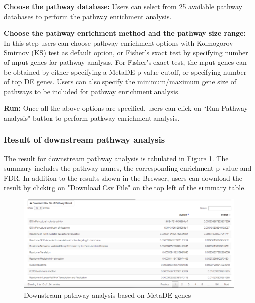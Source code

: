 \begin{steps}
\item \textbf{Choose the pathway database:}
Users can select from 25 available pathway databases to perform the pathway enrichment analysis. 

\item \textbf{Choose the pathway enrichment method and the pathway size range:}
In this step users can choose pathway enrichment options with Kolmogorov-Smirnov (KS) test as default option,
or Fisher's exact test by specifying number of input genes for pathway analysis.
For Fisher's exact test, the input genes can be obtained by either specifying a MetaDE p-value cutoff, or specifying number of top DE genes.
Users can also specify the minimum/maximum gene size of pathways to be included for pathway enrichment analysis.

\item \textbf{Run:}
Once all the above options are specified, users can click on ``Run Pathway analysis" button to perform pathway enrichment analysis.

\end{steps}


\subsubsection{Result of downstream pathway analysis}

The result for downstream pathway analysis  is tabulated in Figure \ref{fig:MetaDEresult2}. 
The summary includes the pathway names, the corresponding enrichment p-value and FDR. 
In addition to the results shown in the Browser, 
users can download the result by clicking on "Download Csv File" on the top left of the summary table. 

\begin{figure}[H]
\begin{center}
\includegraphics[scale=0.3]{./figure/metaDE/MetaDE_pathway.png}
\caption{Downstream pathway analysis based on MetaDE genes}
\label{fig:MetaDEresult2}
\end{center}
\end{figure}


